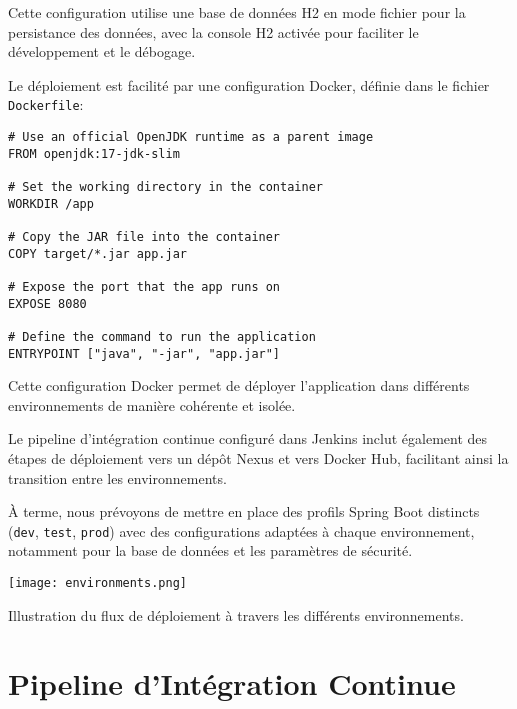 Cette configuration utilise une base de données H2 en mode fichier pour la persistance des données, avec la console H2 activée pour faciliter le développement et le débogage.

Le déploiement est facilité par une configuration Docker, définie dans le fichier \texttt{Dockerfile}:

\begin{verbatim}
# Use an official OpenJDK runtime as a parent image
FROM openjdk:17-jdk-slim

# Set the working directory in the container
WORKDIR /app

# Copy the JAR file into the container
COPY target/*.jar app.jar

# Expose the port that the app runs on
EXPOSE 8080

# Define the command to run the application
ENTRYPOINT ["java", "-jar", "app.jar"]
\end{verbatim}

Cette configuration Docker permet de déployer l'application dans différents environnements de manière cohérente et isolée.

Le pipeline d'intégration continue configuré dans Jenkins inclut également des étapes de déploiement vers un dépôt Nexus et vers Docker Hub, facilitant ainsi la transition entre les environnements.

À terme, nous prévoyons de mettre en place des profils Spring Boot distincts (\texttt{dev}, \texttt{test}, \texttt{prod}) avec des configurations adaptées à chaque environnement, notamment pour la base de données et les paramètres de sécurité.

\begin{center}
\begin{minipage}{\textwidth}
  \begin{tcolorbox}[enhanced, colback=lightgray, colframe=accentblue, arc=5pt, boxrule=0.5pt, drop shadow]
    \centering
    \texttt{[image: environments.png]}
    \label{fig:environments}
    \vspace{0.5cm}
    \parbox{0.9\textwidth}{\centering Illustration du flux de déploiement à travers les différents environnements.}
  \end{tcolorbox}
\end{minipage}
\end{center}

\section{Pipeline d'Intégration Continue}
